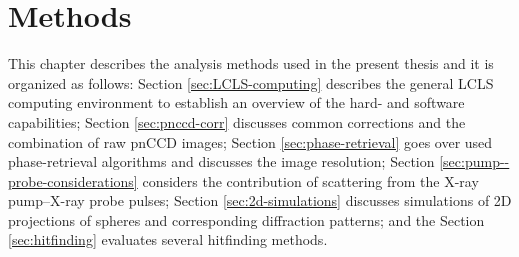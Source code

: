 \chapter{Methods}\label{ch:methods}
This chapter describes the analysis methods used in the present thesis and it is organized as follows: Section \ref{sec:LCLS-computing} describes the general LCLS computing environment to establish an overview of the hard- and software capabilities; Section \ref{sec:pnccd-corr} discusses common corrections and the combination of raw pnCCD images;  Section \ref{sec:phase-retrieval} goes over used phase-retrieval algorithms and discusses the image resolution; Section \ref{sec:pump--probe-considerations} considers the contribution of scattering from the X-ray pump--X-ray probe pulses; Section \ref{sec:2d-simulations} discusses simulations of 2D projections of spheres and corresponding diffraction patterns; and the Section \ref{sec:hitfinding} evaluates several hitfinding methods.
%
%
%
